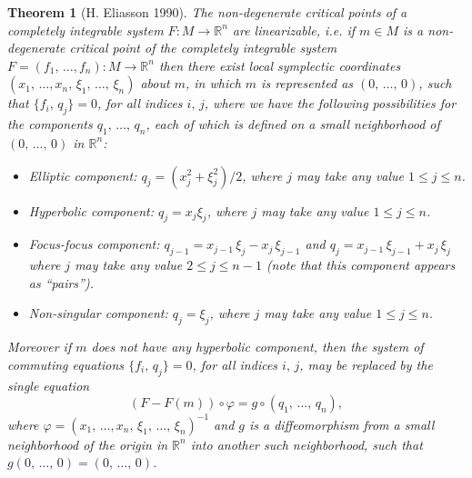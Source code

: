 \documentclass[11pt]{article}
\newtheorem{theorem}{Theorem}[section]
\begin{document}
\begin{theorem}[H. Eliasson 1990] \label{singularities_theorem} The
  non\--degenerate critical points of a completely integrable system
  $F \colon M \to \mathbb{R}^n$ are linearizable, i.e. if $m \in M$ is
  a non-degenerate critical point of the completely integrable system
  $F=(f_1,\,\ldots,f_n): M \rightarrow \mathbb{R}^n$ then there exist
  local symplectic coordinates $(x_1,\, \ldots,x_n,\, \xi_1,\,
  \ldots,\, \xi_n)$ about $m$, in which $m$ is represented as
  $(0,\,\ldots,\, 0)$, such that $\{f_i,\,q_j\}=0$, for all indices
  $i,\,j$, where we have the following possibilities for the
  components $q_1,\,\ldots,\,q_n$, each of which is defined on a small
  neighborhood of $(0,\,\ldots,\,0)$ in $\mathbb{R}^n$:
  \begin{itemize}
  \item[{\rm (i)}] Elliptic component: $q_j = (x_j^2 + \xi_j^2)/2$,
    where $j$ may take any value $1 \le j \le n$.
  \item[{\rm (ii)}] Hyperbolic component: $q_j = x_j \xi_j$, where $j$
    may take any value $1 \le j \le n$.
  \item[{\rm (iii)}] Focus\--focus component: $q_{j-1}=x_{j-1}\,
    \xi_{j} - x_{j}\, \xi_{j-1}$ and $q_{j} =x_{j-1}\, \xi_{j-1}
    +x_{j}\, \xi_{j}$ where $j$ may take any value $2 \le j \le n-1$
    (note that this component appears as ``pairs'').
  \item[{\rm (iv)}] Non\--singular component: $q_{j} = \xi_{j}$, where
    $j$ may take any value $1 \le j \le n$.
  \end{itemize}
  Moreover if $m$ does not have any hyperbolic component, then the
  system of commuting equations $\{f_i,\,q_j\}=0$, for all indices
  $i,\,j$, may be replaced by the single equation
 $$
 (F-F(m))\circ \varphi = g \circ (q_1,\, \ldots,\,q_n),
 $$ 
 where $\varphi=(x_1,\, \ldots,x_n,\, \xi_1,\, \ldots,\, \xi_n)^{-1}$
 and $g$ is a diffeomorphism from a small neighborhood of the origin
 in $\mathbb{R}^n$ into another such neighborhood, such that $g(0,\,
 \ldots,\,0)=(0,\,\ldots,\,0)$.
\end{theorem}
\end{document}
